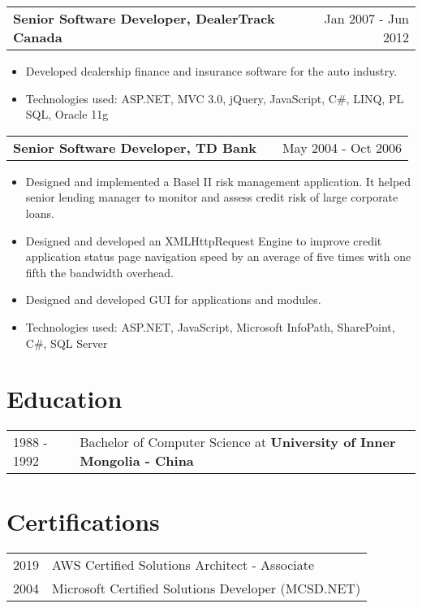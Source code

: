 \documentclass[a4paper,12pt]{article}
\makeatletter
\newenvironment{joblong}[2]
    {
    \begin{tabularx}{\linewidth}{@{}l X r@{}}
    \textbf{#1} & \hfill &  #2 \\[3.75pt]
    \end{tabularx}
    \begin{minipage}[t]{\linewidth}
    \begin{itemize}[nosep,after=\strut, leftmargin=1em, itemsep=3pt,label=--]
    }
    {
    \end{itemize}
    \end{minipage}    
    }
\makeatother
\begin{document}
\begin{joblong}{Senior Software Developer, DealerTrack Canada}{Jan 2007 - Jun 2012}
\item Developed dealership finance and insurance software for the auto industry.
\item Technologies used: ASP.NET, MVC 3.0, jQuery, JavaScript, C\#, LINQ, PL SQL, Oracle 11g
\end{joblong}

\begin{joblong}{Senior Software Developer, TD Bank}{May 2004 - Oct 2006}
\item Designed and implemented a Basel II risk management application. It helped senior lending manager to monitor and assess credit risk of large corporate loans.
\item Designed and developed an XMLHttpRequest Engine to improve credit application status page navigation speed by an average of five times with one fifth the bandwidth overhead. 
\item Designed and developed GUI for applications and modules.
\item Technologies used: ASP.NET, JavaScript, Microsoft InfoPath, SharePoint, C\#, SQL Server
\end{joblong}

\section{Education}
\begin{tabularx}{\linewidth}{@{}l X@{}}	
1988 - 1992 & Bachelor of Computer Science at \textbf{University of Inner Mongolia - China} 
\end{tabularx}

\section{Certifications}
\begin{tabularx}{\linewidth}{@{}l X@{}}
2019 & AWS Certified Solutions Architect - Associate\\
2004 & Microsoft Certified Solutions Developer (MCSD.NET) 
\end{tabularx}


\vfill
\end{document}
